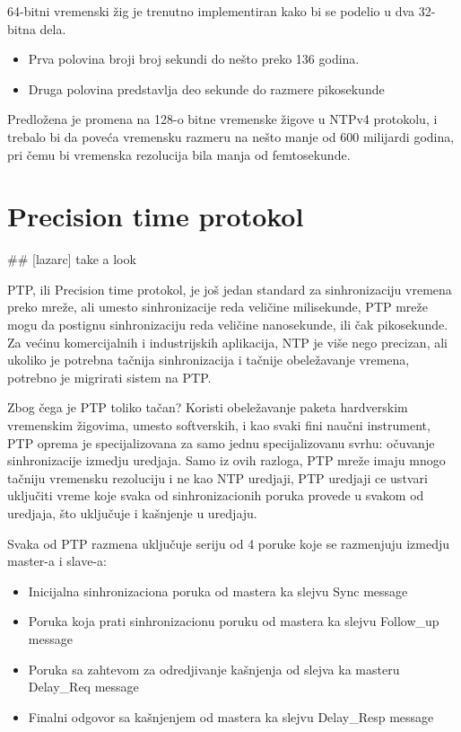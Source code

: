 \documentclass[a4paper,12pt, master]{etf}
\begin{document}
	64-bitni vremenski \v{z}ig je trenutno implementiran kako bi se podelio u
	dva 32-bitna dela.
	\begin{itemize}
		\item Prva polovina broji broj sekundi do ne\v{s}to preko 136 godina.
		\item Druga polovina predstavlja deo sekunde do razmere pikosekunde
	\end{itemize}

	Predlo\v{z}ena je promena na 128-o bitne vremenske \v{z}igove u NTPv4
	protokolu, i trebalo bi da pove\'{c}a vremensku razmeru na ne\v{s}to manje
	od 600 milijardi godina, pri \v{c}emu bi vremenska rezolucija bila manja od
	femtosekunde.

	\section{Precision time protokol}

	\#\# [lazarc] take a look

	PTP, ili Precision time protokol, je jo\v{s} jedan standard za
	sinhronizaciju vremena preko mre\v{z}e, ali umesto sinhronizacije reda
	veli\v{c}ine milisekunde, PTP mre\v{z}e mogu da postignu sinhronizaciju
	reda veli\v{c}ine nanosekunde, ili \v{c}ak pikosekunde. Za ve\'{c}inu
	komercijalnih i	industrijskih aplikacija, NTP je vi\v{s}e nego precizan,
	ali ukoliko je potrebna ta\v{c}nija	sinhronizacija i ta\v{c}nije
	obele\v{z}avanje vremena, potrebno je migrirati sistem na PTP.

	Zbog \v{c}ega je PTP toliko ta\v{c}an? Koristi obele\v{z}avanje paketa
	hardverskim vremenskim \v{z}igovima, umesto softverskih, i kao svaki fini
	nau\v{c}ni instrument, PTP oprema je specijalizovana za samo jednu
	specijalizovanu svrhu: o\v{c}uvanje sinhronizacije izmedju uredjaja. Samo
	iz ovih razloga, PTP mre\v{z}e imaju mnogo ta\v{c}niju vremensku rezoluciju
	i ne kao NTP uredjaji, PTP uredjaji ce ustvari uklju\v{c}iti vreme koje
	svaka od sinhronizacionih poruka provede u svakom od uredjaja, \v{s}to
	uklju\v{c}uje i ka\v{s}njenje u uredjaju.

	Svaka od PTP razmena uklju\v{c}uje seriju od 4 poruke koje se razmenjuju
	izmedju master-a i slave-a:
	\begin{itemize}
		\item Inicijalna sinhronizaciona poruka od mastera ka slejvu {Sync
		message}
		\item Poruka koja prati sinhronizacionu poruku od mastera ka slejvu
		{Follow\_up message}
		\item Poruka sa zahtevom za odredjivanje ka\v{s}njenja od slejva ka
		masteru {Delay\_Req	message}
		\item Finalni odgovor sa ka\v{s}njenjem od mastera ka slejvu
		{Delay\_Resp message}
	\end{itemize}
\end{document}
